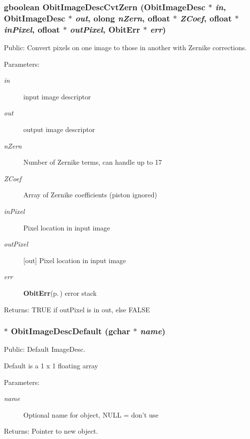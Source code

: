 \subsubsection{\setlength{\rightskip}{0pt plus 5cm}gboolean Obit\-Image\-Desc\-Cvt\-Zern ({\bf Obit\-Image\-Desc} $\ast$ {\em in}, {\bf Obit\-Image\-Desc} $\ast$ {\em out}, {\bf olong} {\em n\-Zern}, {\bf ofloat} $\ast$ {\em ZCoef}, {\bf ofloat} $\ast$ {\em in\-Pixel}, {\bf ofloat} $\ast$ {\em out\-Pixel}, {\bf Obit\-Err} $\ast$ {\em err})}\label{ObitImageDesc_8h_a17}


Public: Convert pixels on one image to those in another with Zernike corrections. 

\begin{Desc}
\item[Parameters:]
\begin{description}
\item[{\em in}]input image descriptor \item[{\em out}]output image descriptor \item[{\em n\-Zern}]Number of Zernike terms, can handle up to 17 \item[{\em ZCoef}]Array of Zernike coefficients (piston ignored) \item[{\em in\-Pixel}]Pixel location in input image \item[{\em out\-Pixel}][out] Pixel location in input image \item[{\em err}]{\bf Obit\-Err}{\rm (p.\,\pageref{structObitErr})} error stack \end{description}
\end{Desc}
\begin{Desc}
\item[Returns:]TRUE if out\-Pixel is in out, else FALSE \end{Desc}
\subsubsection{$\ast$ Obit\-Image\-Desc\-Default (gchar $\ast$ {\em name})}\label{ObitImageDesc_8h_a14}


Public: Default Image\-Desc. 

Default is a 1 x 1 floating array \begin{Desc}
\item[Parameters:]
\begin{description}
\item[{\em name}]Optional name for object, NULL = don't use \end{description}
\end{Desc}
\begin{Desc}
\item[Returns:]Pointer to new object. \end{Desc}
